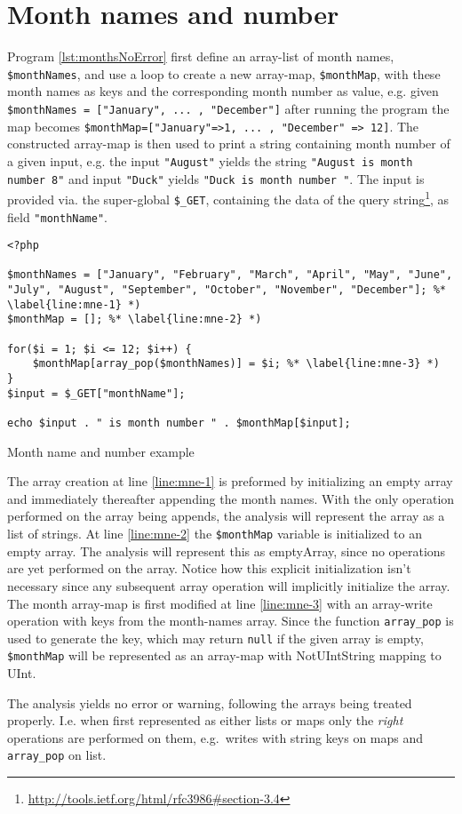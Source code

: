 \section{Month names and number}


Program \ref{lst:monthsNoError} first define an array-list of month names, \texttt{\$monthNames}, and use a loop to create a new array-map, \texttt{\$monthMap}, with these month names as keys and the corresponding month number as value, e.g. given \texttt{\$monthNames = ["January", ... , "December"]} after running the program the map becomes \texttt{\$monthMap=["January"=>1, ... , "December" => 12]}. The constructed array-map is then used to print a string containing month number of a given input, e.g. the input \texttt{"August"} yields the string \texttt{"August is month number 8"} and input \texttt{"Duck"} yields \texttt{"Duck is month number "}. The input is provided via. the super-global \texttt{\$\_GET}, containing the data of the query string\footnote{\url{http://tools.ietf.org/html/rfc3986\#section-3.4}}, as field \texttt{"monthName"}. 


\begin{program}
\begin{lstlisting}
<?php

$monthNames = ["January", "February", "March", "April", "May", "June", "July", "August", "September", "October", "November", "December"]; %* \label{line:mne-1} *)
$monthMap = []; %* \label{line:mne-2} *)

for($i = 1; $i <= 12; $i++) {
	$monthMap[array_pop($monthNames)] = $i; %* \label{line:mne-3} *)
}
$input = $_GET["monthName"];

echo $input . " is month number " . $monthMap[$input];
\end{lstlisting}
\caption{Month name and number example}
\label{lst:monthsNoError}
\end{program}

The array creation at line \ref{line:mne-1} is preformed by initializing an empty array and immediately thereafter appending the month names. With the only operation performed on the array being appends, the analysis will represent the array as a list of strings. At line \ref{line:mne-2} the \texttt{\$monthMap} variable is initialized to an empty array. The analysis will represent this as emptyArray, since no operations are yet performed on the array. Notice how this explicit initialization isn't necessary since any subsequent array operation will implicitly initialize the array. The month array-map is first modified at line \ref{line:mne-3} with an array-write operation with keys from the month-names array. Since the function \texttt{array\_pop} is used to generate the key, which may return \texttt{null} if the given array is empty, \texttt{\$monthMap} will be represented as an array-map with NotUIntString mapping to UInt. 

The analysis yields no error or warning, following the arrays being treated properly. I.e. when first represented as either lists or maps only the \emph{right} operations are performed on them, e.g.\ writes with string keys on maps and \texttt{array\_pop} on list.  
